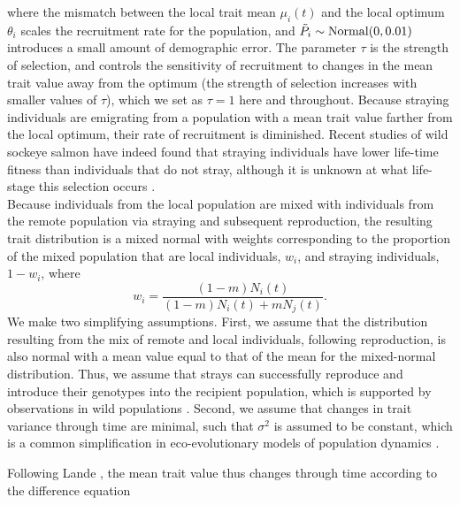 \documentclass{revtex4}
\begin{document}
\noindent where the mismatch between the local trait mean $\mu_i(t)$ and the local optimum $\theta_i$ scales the recruitment rate for the population, and $\tilde{P}_i\sim {\rm Normal}(0,0.01)$ introduces a small amount of demographic error.
The parameter $\tau$ is the strength of selection, and controls the sensitivity of recruitment to changes in the mean trait value away from the optimum (the strength of selection increases with smaller values of $\tau$), which we set as $\tau=1$ here and throughout.
Because straying individuals are emigrating from a population with a mean trait value farther from the local optimum, their rate of recruitment is diminished.
Recent studies of wild sockeye salmon have indeed found that straying individuals have lower life-time fitness than individuals that do not stray, although it is unknown at what life-stage this selection occurs \citep{Peterson:2014gy}.
\\


\noindent Because individuals from the local population are mixed with individuals from the remote population via straying and subsequent reproduction, the resulting trait distribution is a mixed normal with weights corresponding to the proportion of the mixed population that are local individuals, $w_i$, and straying individuals, $1-w_i$, where 
\begin{equation}
w_i=\frac{(1-m)N_i(t)}{(1-m) N_i(t) + m N_j(t)}.
\end{equation}
We make two simplifying assumptions.
First, we assume that the distribution resulting from the mix of remote and local individuals, following reproduction, is also normal with a mean value equal to that of the mean for the mixed-normal distribution.
Thus, we assume that strays can successfully reproduce and introduce their genotypes into the recipient population, which is supported by observations in wild populations \citep{Jasper:2013cc}.
Second, we assume that changes in trait variance through time are minimal, such that $\sigma^2$ is assumed to be constant, which is a common simplification in eco-evolutionary models of population dynamics \citep{Lande:1976ga,Schreiber:2011wx,Gilbert:2014ee,Gibert:2015kc}.



Following Lande \citep{Lande:1976ga}, the mean trait value thus changes through time according to the difference equation
\end{document}
